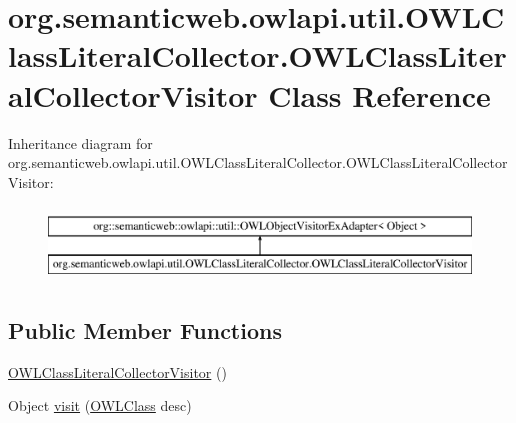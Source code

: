 \hypertarget{classorg_1_1semanticweb_1_1owlapi_1_1util_1_1_o_w_l_class_literal_collector_1_1_o_w_l_class_literal_collector_visitor}{\section{org.\-semanticweb.\-owlapi.\-util.\-O\-W\-L\-Class\-Literal\-Collector.\-O\-W\-L\-Class\-Literal\-Collector\-Visitor Class Reference}
\label{classorg_1_1semanticweb_1_1owlapi_1_1util_1_1_o_w_l_class_literal_collector_1_1_o_w_l_class_literal_collector_visitor}
}
Inheritance diagram for org.\-semanticweb.\-owlapi.\-util.\-O\-W\-L\-Class\-Literal\-Collector.\-O\-W\-L\-Class\-Literal\-Collector\-Visitor\-:\begin{figure}[H]
\begin{center}
\leavevmode
\includegraphics[height=2.000000cm]{classorg_1_1semanticweb_1_1owlapi_1_1util_1_1_o_w_l_class_literal_collector_1_1_o_w_l_class_literal_collector_visitor}
\end{center}
\end{figure}
\subsection*{Public Member Functions}
\begin{DoxyCompactItemize}
\item 
\hyperlink{classorg_1_1semanticweb_1_1owlapi_1_1util_1_1_o_w_l_class_literal_collector_1_1_o_w_l_class_literal_collector_visitor_a4345e75f91549eb71a208a9e7d278e92}{O\-W\-L\-Class\-Literal\-Collector\-Visitor} ()
\item 
Object \hyperlink{classorg_1_1semanticweb_1_1owlapi_1_1util_1_1_o_w_l_class_literal_collector_1_1_o_w_l_class_literal_collector_visitor_a9776a6611cbe418965ee73dd59f26a70}{visit} (\hyperlink{interfaceorg_1_1semanticweb_1_1owlapi_1_1model_1_1_o_w_l_class}{O\-W\-L\-Class} desc)
\end{DoxyCompactItemize}


